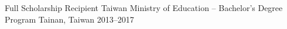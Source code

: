 
\begin{cvhonors}

    \cvhonor
    {Full Scholarship Recipient} %
    {Taiwan Ministry of Education – Bachelor's Degree Program} %
    {Tainan, Taiwan} %
    {2013–2017} %
  
\end{cvhonors}